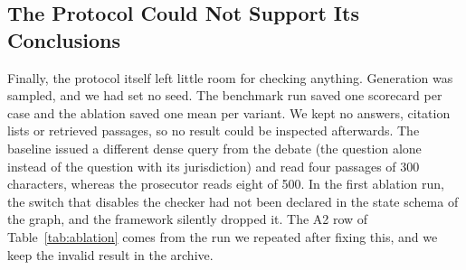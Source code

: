 \documentclass[conference]{IEEEtran}
\begin{document}
\subsection{The Protocol Could Not Support Its Conclusions}
Finally, the protocol itself left little room for checking anything. Generation was sampled, and we had set no seed. The benchmark run saved one scorecard per case and the ablation saved one mean per variant. We kept no answers, citation lists or retrieved passages, so no result could be inspected afterwards. The baseline issued a different dense query from the debate (the question alone instead of the question with its jurisdiction) and read four passages of 300 characters, whereas the prosecutor reads eight of 500. In the first ablation run, the switch that disables the checker had not been declared in the state schema of the graph, and the framework silently dropped it. The A2 row of Table~\ref{tab:ablation} comes from the run we repeated after fixing this, and we keep the invalid result in the archive.

\end{document}
